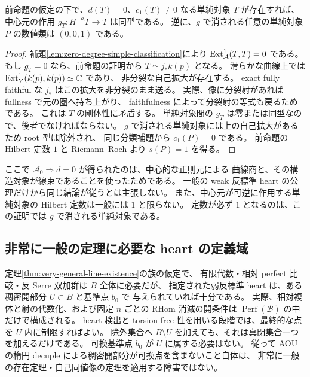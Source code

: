 \begin{corollary}
\label{cor:root-simple-off-divisor}
前命題の仮定の下で、$d(T)=0$、$c_1(T)\ne0$ なる単純対象 $T$ が存在すれば、
中心元の作用 $g_T:H^{-a}T\to T$ は同型である。
逆に、$g$ で消される任意の単純対象 $P$ の数値類は $(0,0,1)$ である。
\end{corollary}
\begin{proof}
補題\ref{lem:zero-degree-simple-classification}により
$\operatorname{Ext}^1_{\mathcal A}(T,T)=0$ である。
もし $g_T=0$ なら、前命題の証明から $T\simeq j_*k(p)$ となる。
滑らかな曲線上では $\operatorname{Ext}^1_Y(k(p),k(p))\simeq\mathbb C$ であり、
非分裂な自己拡大が存在する。
exact fully faithful な $j_*$ はこの拡大を非分裂のまま送る。
実際、像に分裂射があれば fullness で元の圏へ持ち上がり、
faithfulness によって分裂射の等式も戻るためである。
これは $T$ の剛体性に矛盾する。
単純対象間の $g_T$ は零または同型なので、後者でなければならない。
$g$ で消される単純対象には上の自己拡大があるため root 型は除外され、
同じ分類補題から $c_1(P)=0$ である。
前命題の Hilbert 定数 $1$ と Riemann--Roch より $s(P)=1$ を得る。
\end{proof}

\begin{remark}[適用範囲]
ここで $\mathcal A_0\Rightarrow d=0$ が得られたのは、中心的な正則元による
曲線商と、その構造対象が線束であることを使ったためである。
一般の weak 反標準 heart の公理だけから同じ結論が従うとは主張しない。
また、中心元が可逆に作用する単純対象の Hilbert 定数は一般には $1$ と限らない。
定数が必ず $1$ となるのは、この証明では $g$ で消される単純対象である。
\end{remark}

\subsection{非常に一般の定理に必要な heart の定義域}

\begin{remark}[稠密開部分と可換基準点で足りる]
\label{rem:generic-heart-dense-domain}
定理\ref{thm:very-general-line-existence}の族の仮定で、
有限代数・相対 perfect 比較・反 Serre 双加群は $B$ 全体に必要だが、
指定された弱反標準 heart は、ある稠密開部分 $U\subset B$ と基準点 $b_0$ で
与えられていれば十分である。
実際、相対複体と射の代数化、および固定 $n$ ごとの RHom 消滅の開条件は
$\operatorname{Perf}(\mathscr B)$ の中だけで構成される。
heart 検出と torsion-free 性を用いる段階では、最終的な点を $U$ 内に制限すればよい。
除外集合へ $B\setminus U$ を加えても、それは真閉集合一つを加えるだけである。
可換基準点 $b_0$ が $U$ に属する必要はない。
従って AOU の楕円 decuple による稠密開部分が可換点を含まないこと自体は、
非常に一般の存在定理・自己同値像の定理を適用する障害ではない。
\end{remark}
